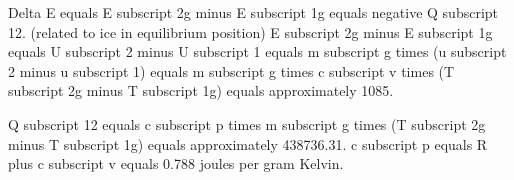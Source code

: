 Delta E equals E subscript 2g minus E subscript 1g equals negative Q subscript 12.  
(related to ice in equilibrium position)  
E subscript 2g minus E subscript 1g equals U subscript 2 minus U subscript 1 equals m subscript g times (u subscript 2 minus u subscript 1) equals m subscript g times c subscript v times (T subscript 2g minus T subscript 1g) equals approximately 1085.  

Q subscript 12 equals c subscript p times m subscript g times (T subscript 2g minus T subscript 1g) equals approximately 438736.31.  
c subscript p equals R plus c subscript v equals 0.788 joules per gram Kelvin.